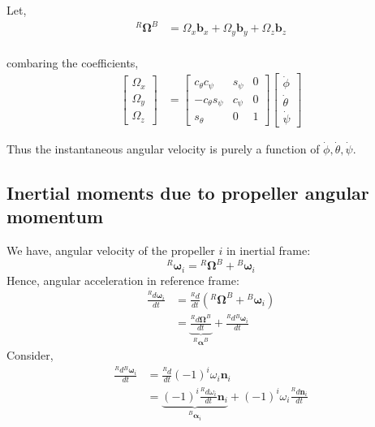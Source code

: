 Let,
\begin{align*}
    {}^R\pmb \Omega^B  &= \Omega_x \pmb b_x + \Omega_y \pmb b_y + \Omega_z \pmb b_z\\
\end{align*}

combaring the coefficients,
\begin{align*}
    \begin{bmatrix}
        \Omega_x \\ \Omega_y \\ \Omega_z
    \end{bmatrix}
    &=
    \begin{bmatrix}
        c_{\theta}c_{\psi} &  s_{\psi} & 0\\
        -c_{\theta}s_{\psi} & c_{\psi} & 0\\
        s_{\theta} & 0 & 1
    \end{bmatrix}
    \begin{bmatrix}
        \dot \phi \\ \dot \theta \\ \dot \psi
    \end{bmatrix}
\end{align*}

Thus the instantaneous angular velocity is purely a function of $\dot \phi , \dot \theta , \dot \psi $.


\subsection{Inertial moments due to propeller angular momentum}
We have, angular velocity of the propeller $i$ in inertial frame:
$${}^R \pmb \omega_i = {}^R \pmb \Omega^B + {}^B \pmb \omega_i$$
Hence, angular acceleration in reference frame:
\begin{align*}
    \frac{{}^R d \pmb \omega_i}{dt} &= \frac{{}^R d}{dt}\left( {}^R \pmb \Omega^B + {}^B \pmb \omega_i \right)\\
    &= \underbrace{\frac{{}^R d \pmb \Omega^B}{dt}}_{{}^R\pmb\alpha^B} + \frac{{}^R d{}^B \pmb \omega_i}{dt}
\end{align*}
Consider,
\begin{align*}
    \frac{{}^R d{}^B \pmb \omega_i}{dt} &= \frac{{}^R d}{dt} (-1)^{i} \omega_i \pmb n_i\\
    &= \underbrace{(-1)^{i} \frac{{}^R d\omega_i }{dt} \pmb n_i}_{{}^B \pmb \alpha_i} +
    (-1)^{i} \omega_i \frac{{}^R d\pmb n_i}{dt}
\end{align*}


